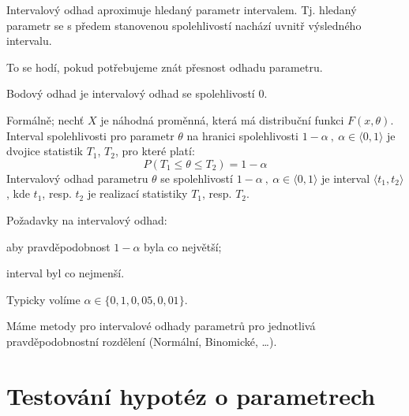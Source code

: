 \begin{compactitem}
    \item Intervalový odhad aproximuje hledaný parametr intervalem. Tj. hledaný parametr se s předem stanovenou spolehlivostí nachází uvnitř výsledného intervalu. \begin{compactitem}
        \item To se hodí, pokud potřebujeme znát přesnost odhadu parametru.
        \item Bodový odhad je intervalový odhad se spolehlivostí 0.
    \end{compactitem}

    \item Formálně; nechť $X$ je náhodná proměnná, která má distribuční funkci $F( x, \theta)$. Interval spolehlivosti pro parametr $\theta$ na hranici spolehlivosti $1 - \alpha ~,~ \alpha \in \langle 0, 1 \rangle$ je dvojice statistik $T_1$, $T_2$, pro které platí:
    $$ P(T_1 \leq \theta \leq T_2) = 1 - \alpha $$
    Intervalový odhad parametru $\theta$ se spolehlivostí $1 - \alpha ~,~ \alpha \in \langle 0, 1 \rangle$ je interval $\langle t_1, t_2 \rangle$, kde $t_1$, resp. $t_2$ je realizací statistiky $T_1$, resp. $T_2$.

    \item Požadavky na intervalový odhad: \begin{compactitem}
        \item aby pravděpodobnost $1 - \alpha$ byla co největší;
        \item interval byl co nejmenší.
        \item Typicky volíme $\alpha \in \{ 0,1, 0,05, 0,01 \}$.
    \end{compactitem}

    \item Máme metody pro intervalové odhady parametrů pro jednotlivá pravděpodobnostní rozdělení (Normální, Binomické, \dots).
\end{compactitem}


\section{Testování hypotéz o parametrech}

